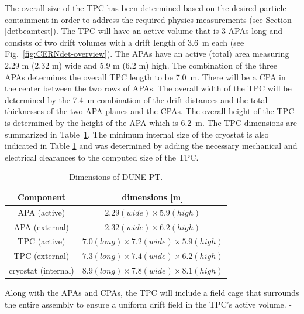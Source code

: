 The overall size of the TPC has been determined based on the desired particle containment in order to address the required physics measurements (see Section \ref{detbeamtest}). The TPC will have an active volume that is 3 APAs long and consists of two drift volumes with a drift length of 3.6~m each (see Fig.~\ref{fig:CERNdet-overview}).  
The APAs have an active (total) area measuring 2.29 m (2.32 m) wide and 5.9 m (6.2 m) high. The combination of the three APAs determines the overall TPC length to be 7.0~m. There will be a CPA in the center between the two rows of APAs.  
The overall width of the TPC will be determined by the 7.4~m combination of the drift distances and the total thicknesses of the two APA planes and the CPAs.  
The overall height of the TPC is determined by the height of the APA which is 6.2~m.  The TPC dimensions are summarized in 
Table~\ref{table:TPC-dim}.
%
The minimum internal size of the cryostat is also indicated in Table \ref{table:TPC-dim} and was determined by adding the necessary mechanical and electrical clearances to the computed size of the TPC.  
 
\begin{table}[h]
\centering
\begin{tabular}{|c|c|}
\hline
\textbf{ Component } & dimensions [m]  \\ \hline \hline
APA  (active) &  $2.29 (wide) \times 5.9 (high)$ \\ \hline
APA  (external) &  $2.32 (wide) \times 6.2 (high)$ \\ \hline
TPC (active)       & $7.0 (long) \times 7.2 (wide) \times 5.9 (high)$  \\ \hline
TPC (external)       & $7.3 (long) \times 7.4 (wide) \times 6.2 (high)$  \\ \hline
cryostat (internal) &  $8.9 (long) \times 7.8 (wide) \times 8.1 (high)$  \\ \hline
\end{tabular}
\caption{Dimensions of DUNE-PT.}
\label{table:TPC-dim}
\end{table} 

Along with the APAs and CPAs, the TPC will include a field cage that surrounds the entire assembly to ensure a uniform drift field in the TPC's active volume. -


